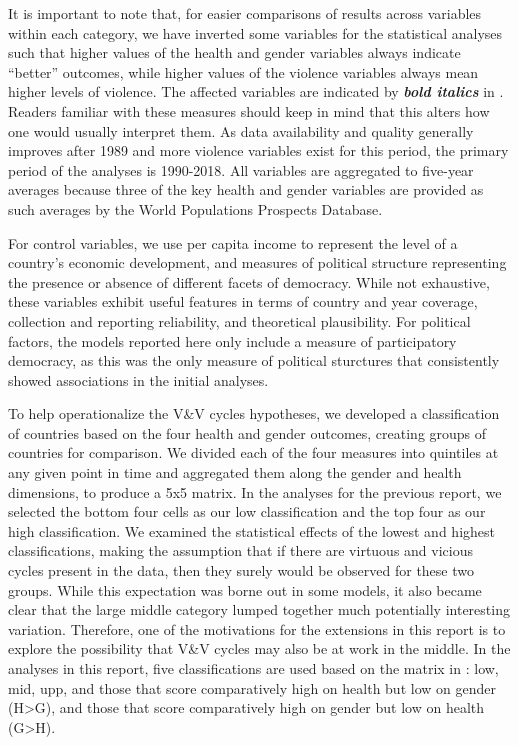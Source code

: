 \documentclass[12pt]{article}
\begin{document}
It is important to note that, for easier comparisons of results across variables within each category, we have inverted some variables for the statistical analyses such that higher values of the health and gender variables always indicate \enquote{better} outcomes, while higher values of the violence variables always mean higher levels of violence. The affected variables are indicated by \textbf{\textit{bold italics}} in . Readers familiar with these measures should keep in mind that this alters how one would usually interpret them.
As data availability and quality generally improves after 1989 and more violence variables exist for this period, the primary period of the analyses is 1990-2018. All variables are aggregated to five-year averages because three of the key health and gender variables are provided as such averages by the World Populations Prospects Database.

For control variables, we use per capita income to represent the level of a country's economic development, and measures of political structure representing the presence or absence of different facets of democracy. While not exhaustive, these variables exhibit useful features in terms of country and year coverage, collection and reporting reliability, and theoretical plausibility. For political factors, the models reported here only include a measure of participatory democracy, as this was the only measure of political sturctures that consistently showed associations in the initial analyses.

To help operationalize the V\&V cycles hypotheses, we developed a classification of countries based on the four health and gender outcomes, creating groups of countries for comparison.
We divided each of the four measures into quintiles at any given point in time and aggregated them along the gender and health dimensions, to produce a 5x5 matrix.
In the analyses for the previous report, we selected the bottom four cells as our low classification and the top four as our high classification. We examined the statistical effects of the lowest and highest classifications, making the assumption that if there are virtuous and vicious cycles present in the data, then they surely would be observed for these two groups. While this expectation was borne out in some models, it also became clear that the large middle category lumped together much potentially interesting variation. Therefore, one of the motivations for the extensions in this report is to explore the possibility that V\&V cycles may also be at work in the middle. In the analyses in this report, five classifications are used based on the matrix in : low, mid, upp, and those that score comparatively high on health but low on gender ({H>G}), and those that score comparatively high on gender but low on health ({G>H}).
\end{document}
